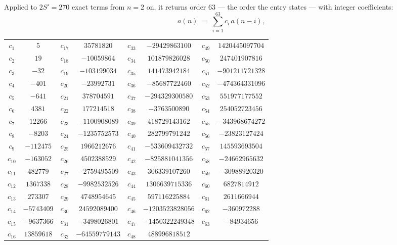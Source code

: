 \documentclass[11pt,a4paper]{article}
\theoremstyle{plain}
\theoremstyle{definition}
\begin{document}
Applied to $2S'=270$ exact terms from $n=2$ on, it returns order $63$ --- the
order the entry states --- with integer coefficients:
\[
a(n)\;=\;\sum_{i=1}^{63}c_i\,a(n-i),
\]
\begin{center}\small
\begin{tabular}{cccccccc}
$c_{1}$ & $5$ & $c_{17}$ & $35781820$ & $c_{33}$ & $-29429863100$ & $c_{49}$ & $1420445097704$ \\
$c_{2}$ & $19$ & $c_{18}$ & $-10059864$ & $c_{34}$ & $101879826028$ & $c_{50}$ & $247401907816$ \\
$c_{3}$ & $-32$ & $c_{19}$ & $-103199034$ & $c_{35}$ & $141473942184$ & $c_{51}$ & $-901211721328$ \\
$c_{4}$ & $-401$ & $c_{20}$ & $-23992731$ & $c_{36}$ & $-85687722460$ & $c_{52}$ & $-474364331096$ \\
$c_{5}$ & $-641$ & $c_{21}$ & $378704591$ & $c_{37}$ & $-294329300580$ & $c_{53}$ & $551977177552$ \\
$c_{6}$ & $4381$ & $c_{22}$ & $177214518$ & $c_{38}$ & $-3763500890$ & $c_{54}$ & $254052723456$ \\
$c_{7}$ & $12266$ & $c_{23}$ & $-1100908089$ & $c_{39}$ & $418729143162$ & $c_{55}$ & $-343968674272$ \\
$c_{8}$ & $-8203$ & $c_{24}$ & $-1235752573$ & $c_{40}$ & $282799791242$ & $c_{56}$ & $-23823127424$ \\
$c_{9}$ & $-112475$ & $c_{25}$ & $1966212676$ & $c_{41}$ & $-533609432732$ & $c_{57}$ & $145593693504$ \\
$c_{10}$ & $-163052$ & $c_{26}$ & $4502388529$ & $c_{42}$ & $-825881041356$ & $c_{58}$ & $-24662965632$ \\
$c_{11}$ & $482779$ & $c_{27}$ & $-2759495509$ & $c_{43}$ & $306339107260$ & $c_{59}$ & $-30988920320$ \\
$c_{12}$ & $1367338$ & $c_{28}$ & $-9982532526$ & $c_{44}$ & $1306639715336$ & $c_{60}$ & $6827814912$ \\
$c_{13}$ & $273307$ & $c_{29}$ & $4748954645$ & $c_{45}$ & $597116225884$ & $c_{61}$ & $2611666944$ \\
$c_{14}$ & $-5743409$ & $c_{30}$ & $24592089400$ & $c_{46}$ & $-1203523828056$ & $c_{62}$ & $-360972288$ \\
$c_{15}$ & $-9637366$ & $c_{31}$ & $-3498026801$ & $c_{47}$ & $-1450322249348$ & $c_{63}$ & $-84934656$ \\
$c_{16}$ & $13859618$ & $c_{32}$ & $-64559779143$ & $c_{48}$ & $488996818512$ &  &  \\
\end{tabular}
\end{center}
\end{document}
